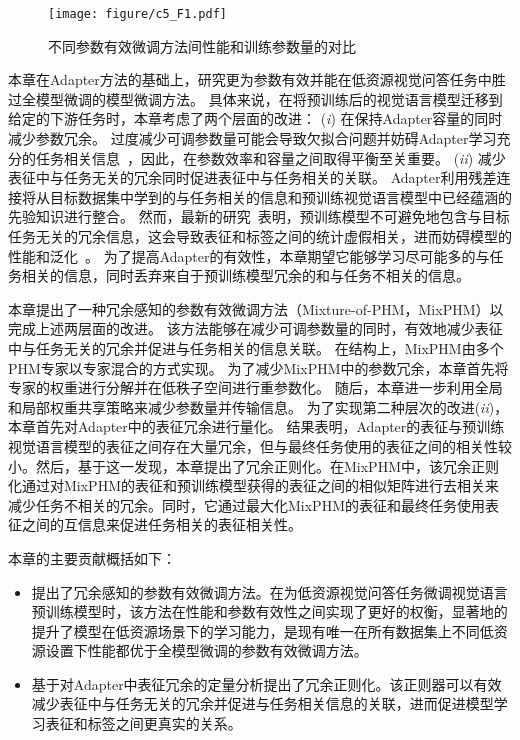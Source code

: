 \begin{figure}
\centering
\texttt{[image: figure/c5\_F1.pdf]}
\caption{不同参数有效微调方法间性能和训练参数量的对比
}
\label{fig:c5_acc_param}
\end{figure}


本章在Adapter方法的基础上，研究更为参数有效并能在低资源视觉问答任务中胜过全模型微调的模型微调方法。
具体来说，在将预训练后的视觉语言模型迁移到给定的下游任务时，本章考虑了两个层面的改进：
(\emph{i}) 在保持Adapter容量的同时减少参数冗余。
过度减少可调参数量可能会导致欠拟合问题并妨碍Adapter学习充分的任务相关信息~\cite{karimi2021compacter}，因此，在参数效率和容量之间取得平衡至关重要。
(\emph{ii}) 减少表征中与任务无关的冗余同时促进表征中与任务相关的关联。
Adapter利用残差连接将从目标数据集中学到的与任务相关的信息和预训练视觉语言模型中已经蕴涵的先验知识进行整合。
然而，最新的研究~\cite{jiang2022finetuning,mahabadi2021variational,wang2021infobert}表明，预训练模型不可避免地包含与目标任务无关的冗余信息，这会导致表征和标签之间的统计虚假相关，进而妨碍模型的性能和泛化~\cite{tishby2015deep,wang2022rethinking}。
为了提高Adapter的有效性，本章期望它能够学习尽可能多的与任务相关的信息，同时丢弃来自于预训练模型冗余的和与任务不相关的信息。


本章提出了一种冗余感知的参数有效微调方法（Mixture-of-PHM，MixPHM）以完成上述两层面的改进。
该方法能够在减少可调参数量的同时，有效地减少表征中与任务无关的冗余并促进与任务相关的信息关联。
在结构上，MixPHM由多个PHM专家以专家混合的方式实现。
为了减少MixPHM中的参数冗余，本章首先将专家的权重进行分解并在低秩子空间进行重参数化。
随后，本章进一步利用全局和局部权重共享策略来减少参数量并传输信息。
为了实现第二种层次的改进(\emph{ii})，本章首先对Adapter中的表征冗余进行量化。
结果表明，Adapter的表征与预训练视觉语言模型的表征之间存在大量冗余，但与最终任务使用的表征之间的相关性较小。然后，基于这一发现，本章提出了冗余正则化。在MixPHM中，该冗余正则化通过对MixPHM的表征和预训练模型获得的表征之间的相似矩阵进行去相关来减少任务不相关的冗余。同时，它通过最大化MixPHM的表征和最终任务使用表征之间的互信息来促进任务相关的表征相关性。


本章的主要贡献概括如下：
\begin{itemize}
\item 提出了冗余感知的参数有效微调方法。在为低资源视觉问答任务微调视觉语言预训练模型时，该方法在性能和参数有效性之间实现了更好的权衡，显著地的提升了模型在低资源场景下的学习能力，是现有唯一在所有数据集上不同低资源设置下性能都优于全模型微调的参数有效微调方法。
\item 基于对Adapter中表征冗余的定量分析提出了冗余正则化。该正则器可以有效减少表征中与任务无关的冗余并促进与任务相关信息的关联，进而促进模型学习表征和标签之间更真实的关系。
\end{itemize}





